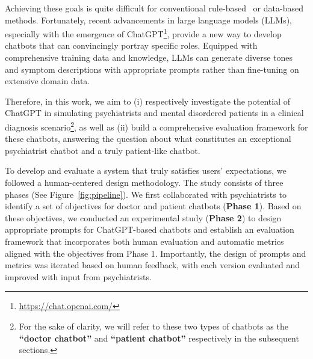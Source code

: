 Achieving these goals is quite difficult for conventional rule-based~\cite{Medeiros2018UsingCF,Jaiswal2019Virtual} or data-based~\cite{yao-etal-2022-d4, Fansi2022DDXPlus, Lin2021Graph} methods. Fortunately, recent advancements in large language models (LLMs), especially with the emergence of ChatGPT\footnote{\url{https://chat.openai.com/}}, provide a new way to develop chatbots that can convincingly portray specific roles.  Equipped with comprehensive training data and knowledge, LLMs can generate diverse tones and symptom descriptions with appropriate prompts rather than fine-tuning on extensive domain data.

Therefore, in this work, we aim to (i) respectively investigate the potential of ChatGPT in simulating psychiatrists and mental disordered patients in a clinical diagnosis scenario\footnote{For the sake of clarity, we will refer to these two types of chatbots as the \textbf{``doctor chatbot''} and \textbf{``patient chatbot''} respectively in the subsequent sections.}, 
as well as (ii) build a comprehensive evaluation framework for these chatbots, answering the question about what constitutes an exceptional psychiatrist chatbot and a truly patient-like chatbot.

To develop and evaluate a system that truly satisfies users' expectations, we followed a human-centered design methodology. The study consists of three phases (See Figure~\ref{fig:pipeline}).
We first collaborated with psychiatrists to identify a set of objectives for doctor and patient chatbots (\textbf{Phase 1}). 
Based on these objectives, we conducted an experimental study (\textbf{Phase 2}) to design appropriate prompts for ChatGPT-based chatbots and establish an evaluation framework that incorporates both human evaluation and automatic metrics aligned with the objectives from Phase 1. Importantly, the design of prompts and metrics was iterated based on human feedback, with each version evaluated and improved with input from psychiatrists.

